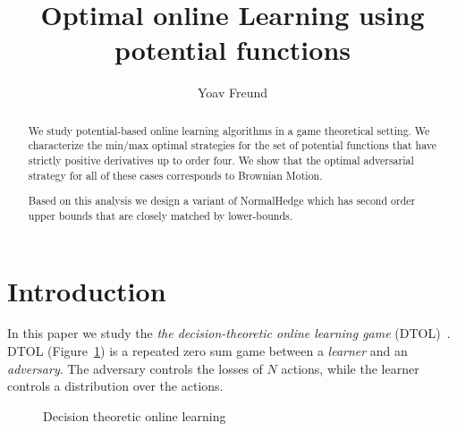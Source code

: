 \documentclass{article}[12pt]
\title{Optimal online Learning using potential functions}
\author{Yoav Freund}
\begin{document}
\maketitle
\begin{abstract}

  We study potential-based online learning algorithms in a game
  theoretical setting. We characterize the min/max optimal strategies
  for the set of potential functions that have strictly positive
  derivatives up to order four. We show that the optimal adversarial
  strategy for all of these cases corresponds to Brownian Motion.

  Based on this analysis we design a variant of NormalHedge which has
  second order upper bounds that are closely matched by lower-bounds.
\end{abstract}

\section{Introduction}
In this paper we study the {\em the decision-theoretic online learning game}
(DTOL)~\cite{freund1997decision}. DTOL (Figure~\ref{fig:DTOL}) is a
repeated zero sum game between a {\em learner} and an {\em
  adversary}. The adversary controls the losses of $N$ actions, while
the learner controls a distribution over the actions.

\begin{figure}[ht!]
\caption{Decision theoretic online learning \label{fig:DTOL}}
\end{figure}
\end{document}
